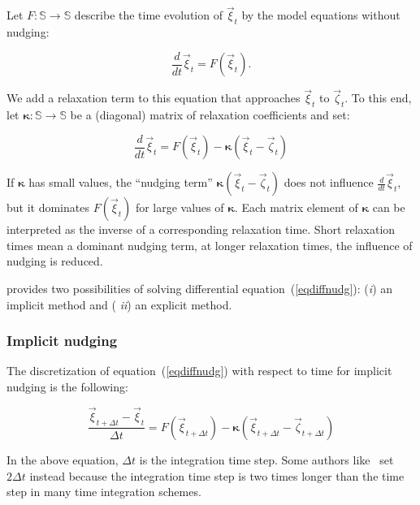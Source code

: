 Let $F: \mathbb{S}\rightarrow\mathbb{S}$ describe the time evolution of
$\vec{\xi}_t$ by the model equations without nudging:

\begin{equation}\label{eqintfree}
\frac{d}{dt}\vec{\xi}_t=F(\vec{\xi}_t).
\end{equation}

We add a relaxation term to this
equation that approaches $\vec{\xi}_t$ to $\vec{\zeta}_t$. To this
end, let $\boldsymbol{\kappa}:\mathbb{S}\rightarrow\mathbb{S}$ be a
(diagonal) matrix of relaxation coefficients and set:

\begin{equation}\label{eqdiffnudg}
\frac{d}{dt}\vec{\xi}_t=F(\vec{\xi}_t)-\boldsymbol{\kappa}(\vec{\xi}_t-\vec{\zeta}_t)
\end{equation}

If $\boldsymbol{\kappa}$ has small values, the ``nudging term''
$\boldsymbol{\kappa}(\vec{\xi}_t-\vec{\zeta}_t)$ does not influence
$\frac{d}{dt}\vec{\xi}_t$, but it dominates $F(\vec{\xi}_t)$ for large
values of $\boldsymbol{\kappa}$. Each matrix element of
$\boldsymbol{\kappa}$ can be interpreted as the inverse of a
corresponding relaxation time. Short relaxation times mean a dominant
nudging term, at longer relaxation times, the influence of nudging is
reduced. 

\echam{} provides two possibilities of solving differential
equation~(\ref{eqdiffnudg}): ({\it i\/}) an implicit method and ({\it
  ii\/}) an explicit 
method.

\subsubsection{Implicit nudging}\label{secnudgimpl}

The discretization of equation~(\ref{eqdiffnudg}) with respect to time
for implicit nudging is the following:

\begin{equation}\label{eqdiffnudgimpl}
\frac{\vec{\xi}_{t+\Delta t}-\vec{\xi}_{t}}{\Delta t}
= F(\vec{\xi}_{t+\Delta t})-\boldsymbol{\kappa}(\vec{\xi}_{t+\Delta
  t}-\vec{\zeta}_{t+\Delta t}) 
\end{equation}

In the above equation, $\Delta t$ is the integration time step. Some
authors like~\cite{kri913} set $2\Delta t$ instead because the integration
time step is two times longer than the time step in many time
integration schemes. 

